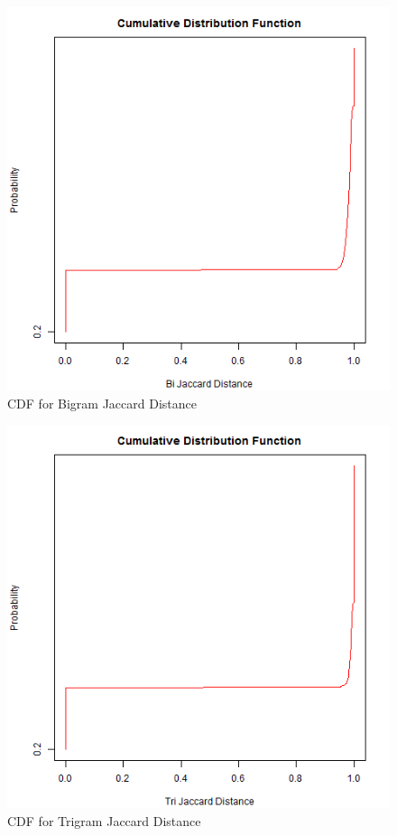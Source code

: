 \documentclass[12pt]{Report}
\begin{document}
 
\begin{figure}[ht]    
    \begin{center}
        \includegraphics[scale=0.60]{bigram.png}
        \caption{CDF for Bigram Jaccard Distance }
        \label{BiGram Jaccard Distance}
    \end{center}
\end{figure}
\newpage


\begin{figure}[ht]    
    \begin{center}
        \includegraphics[scale=0.60]{trigram.png}
        \caption{CDF for Trigram Jaccard Distance }
        \label{TriGram Jaccard Distance}
    \end{center}
\end{figure}
\newpage
\end{document}
